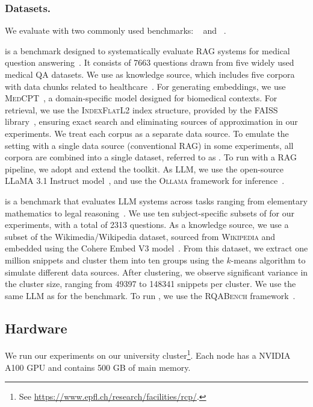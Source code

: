 \subsubsection{Datasets.}
We evaluate \sys with two commonly used benchmarks: \mirage~\cite{xiong-etal-2024-benchmarking} and \mmlu~\cite{hendrycks2020measuring}.

\textbf{\mirage} is a benchmark designed to systematically evaluate \ac{RAG} systems for medical question answering~\cite{xiong-etal-2024-benchmarking}.
It consists of \num{7663} questions drawn from five widely used medical QA datasets.
We use \medrag as knowledge source, which includes five corpora with data chunks related to healthcare~\cite{xiong-etal-2024-benchmarking}.
For generating embeddings, we use \textsc{MedCPT}~\cite{jin2023medcpt}, a domain-specific model designed for biomedical contexts.
For retrieval, we use the \textsc{IndexFlatL2} index structure, provided by the \textsc{FAISS} library~\cite{douze2024faiss}, ensuring exact search and eliminating sources of approximation in our experiments.
We treat each corpus as a separate data source.
To emulate the setting with a single data source (conventional \ac{RAG}) in some experiments, all corpora are combined into a single dataset, referred to as \medcorp.
To run \sys with a \ac{RAG} pipeline, we adopt and extend the \medrag toolkit.
As \ac{LLM}, we use the open-source LLaMA 3.1 Instruct model~\cite{dubey2024llama}, and use the \textsc{Ollama} framework for inference~\cite{ollama}.

\textbf{\mmlu} is a benchmark that evaluates \ac{LLM} systems across tasks ranging from elementary mathematics to legal reasoning~\cite{hendrycks2020measuring}.
We use ten subject-specific subsets of \mmlu for our experiments, with a total of \num{2313} questions.
As a knowledge source, we use a subset of the Wikimedia/Wikipedia dataset, sourced from \textsc{Wikipedia} and embedded using the Cohere Embed V3 model~\cite{cohere_wikipedia_2023}.
From this dataset, we extract one million snippets and cluster them into ten groups using the $k$-means algorithm to simulate different data sources. 
After clustering, we observe significant variance in the cluster size, ranging from \num{49397} to \num{148341} snippets per cluster.
We use the same \ac{LLM} as for the \mirage benchmark.
To run \mmlu, we use the \textsc{RQABench} framework~\cite{retrieval_qa_benchmark}. 

\subsection{Hardware}
We run our experiments on our university cluster\footnote{See \url{https://www.epfl.ch/research/facilities/rcp/}.}.
Each node has a NVIDIA A100 GPU and contains 500 GB of main memory.

